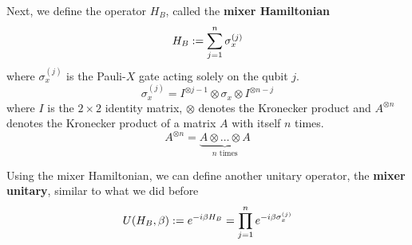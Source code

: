 Next, we define the operator $H_B$, called the \textbf{mixer Hamiltonian}
\begin{equation}
	H_B := \sum_{j=1}^n \sigma_x^{(j)}
	\label{eq:mixerHam}
\end{equation}
where $\sigma_x^{(j)}$ is the Pauli-$X$ gate acting solely on the qubit $j$.
\begin{equation}
	\sigma_x^{(j)} = I^{\otimes j-1} \otimes \sigma_x \otimes I^{\otimes n-j}
\end{equation}
where $I$ is the $2\times 2$ identity matrix, $\otimes$ denotes the Kronecker product and $A^{\otimes n}$ denotes the Kronecker product of a matrix $A$ with itself $n$ times. 
\begin{equation}
	A^{\otimes n} = \underbrace{A \otimes \dots \otimes A}_{n \text{ times}}
\end{equation}

Using the mixer Hamiltonian, we can define another unitary operator, the \textbf{mixer unitary}, similar to what we did before
\begin{equation}
	U(H_B,\beta) := e^{-i\beta H_B} = \prod_{j=1}^n e^{-i \beta \sigma_x^{(j)}}
	\label{eq:mixerUnitary}
\end{equation}

